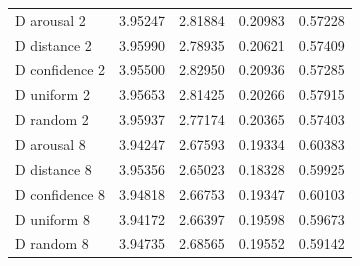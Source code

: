 \begin{longtable}{lrrrr}
D arousal 2 & 3.95247 & 2.81884 & 0.20983 & 0.57228\\
D distance 2 & 3.95990 & 2.78935 & 0.20621 & 0.57409\\
D confidence 2 & 3.95500 & 2.82950 & 0.20936 & 0.57285\\
D uniform 2 & 3.95653 & 2.81425 & 0.20266 & 0.57915\\
D random 2 & 3.95937 & 2.77174 & 0.20365 & 0.57403\\
D arousal 8 & 3.94247 & 2.67593 & 0.19334 & 0.60383\\
D distance 8 & 3.95356 & 2.65023 & 0.18328 & 0.59925\\
D confidence 8 & 3.94818 & 2.66753 & 0.19347 & 0.60103\\
D uniform 8 & 3.94172 & 2.66397 & 0.19598 & 0.59673\\
D random 8 & 3.94735 & 2.68565 & 0.19552 & 0.59142\\
\bottomrule\end{longtable}\endgroup

